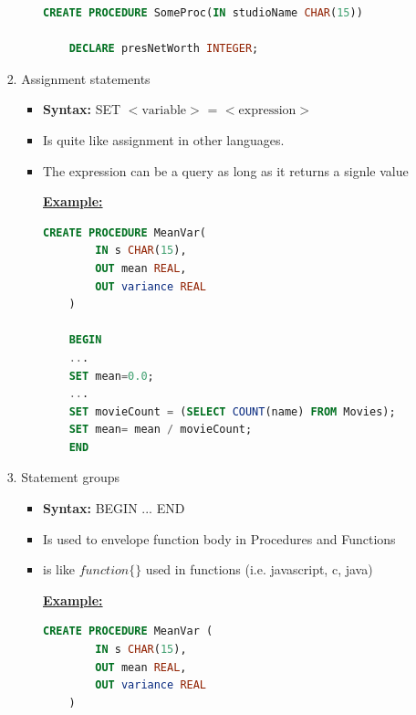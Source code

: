 \documentclass[12pt]{article}
\begin{document}
\begin{enumerate}[1.]
\begin{enumerate}[a)]
\begin{itemize}
\begin{enumerate}[1.]
\begin{itemize}
                    \bigskip

    \begin{lstlisting}[language=SQL]
    CREATE PROCEDURE SomeProc(IN studioName CHAR(15))

    DECLARE presNetWorth INTEGER;
    \end{lstlisting}

                \end{itemize}
                \item Assignment statements
                \begin{itemize}
                    \item \textbf{Syntax:} SET $<\text{variable}>$ = $<\text{expression}>$
                    \item Is quite like assignment in other languages.
                    \item The expression can be a query as long as it returns a signle value

                    \bigskip

                    \underline{\textbf{Example:}}

    \begin{lstlisting}[language=SQL]
    CREATE PROCEDURE MeanVar(
        IN s CHAR(15),
        OUT mean REAL,
        OUT variance REAL
    )

    BEGIN
    ...
    SET mean=0.0;
    ...
    SET movieCount = (SELECT COUNT(name) FROM Movies);
    SET mean= mean / movieCount;
    END
    \end{lstlisting}
                \end{itemize}
                \item Statement groups
                \begin{itemize}
                    \item \textbf{Syntax:} BEGIN ... END
                    \item Is used to envelope function body in Procedures and Functions
                    \item is like $function \{\}$ used in functions (i.e. javascript, c, java)

                    \bigskip

                    \underline{\textbf{Example:}}

                    \bigskip

    \begin{lstlisting}[language=SQL]
    CREATE PROCEDURE MeanVar (
        IN s CHAR(15),
        OUT mean REAL,
        OUT variance REAL
    )


\end{lstlisting}
\end{itemize}
\end{enumerate}
\end{itemize}
\end{enumerate}
\end{enumerate}
\end{document}
